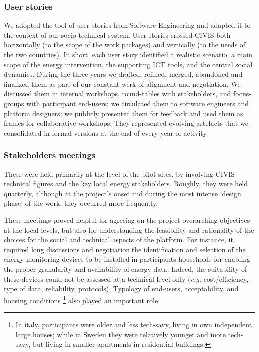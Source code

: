 \subsubsection{User stories}

We adopted the tool of user stories \cite{Kankainen2012} from Software Engineering and adapted it to the context of our
socio technical system. User stories crossed CIVIS both horizontally (to the
scope of the work packages) and vertically (to the needs of the two countries). In short, each user
story identified a realistic scenario, a main scope of the energy intervention, the supporting ICT tools,
and the central social dynamics. During the three years we drafted, refined, merged, abandoned and
finalized them as part of our constant work of alignment and negotiation. We discussed them in internal
workshops, round-tables with stakeholders, and focus-groups with participant end-users; we circulated
them to software engineers and platform designers; we publicly presented them for feedback and used them
as frames for collaborative workshops. They represented evolving artefacts that we consolidated in formal
versions at the end of every year of activity. 


\subsubsection{Stakeholders meetings} %

These were held primarily at the level of the pilot sites, by involving CIVIS technical figures and the
key local energy stakeholders. Roughly, they were held quarterly, although at the project's onset and during
the most intense `design phase' of the work, they occurred more frequently.

These meetings proved helpful for agreeing on the project overarching objectives at the local levels, but also
for understanding the feasibility and rationality of the choices for the social and technical aspects of the platform.
For instance, it required long discussions and negotiation the identification and selection of the energy monitoring devices to be installed in
participants households for enabling the proper granularity and availability of energy data. Indeed,
the suitability of these devices could not be assessed at a technical level only (\textit{e.g.} cost/efficiency, type of data,
reliability, protocols). Typology of end-users, acceptability, and housing conditions \footnote{ In italy, participants were older and less tech-savy, living in own
independent, large houses; while in Sweden they were relatively younger and more tech-savy, but living in smaller apartments in residential buildings.}
also played an important role. 

